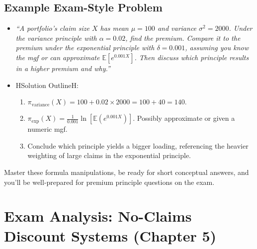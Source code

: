 \documentclass[13pt,a4paper]{article}
\begin{document}
\subsection{Example Exam-Style Problem}
\begin{itemize}
  \item \emph{“A portfolio’s claim size \(X\) has mean \(\mu=100\) and variance \(\sigma^2=2000\). Under the variance principle with \(\alpha=0.02\), find the premium. Compare it to the premium under the exponential principle with \(\delta=0.001\), assuming you know the mgf or can approximate \(\mathbb{E}[e^{0.001X}]\). Then discuss which principle results in a higher premium and why.”}
  \item HSolution OutlineH:
    \begin{enumerate}
      \item \(\pi_{\text{variance}}(X) = 100 + 0.02\times 2000=100+40=140.\)
      \item \(\pi_{\text{exp}}(X)=\frac{1}{0.001}\ln[\mathbb{E}(e^{0.001X})].\) Possibly approximate or given a numeric mgf. 
      \item Conclude which principle yields a bigger loading, referencing the heavier weighting of large claims in the exponential principle.
    \end{enumerate}
\end{itemize}

\noindent
Master these formula manipulations, be ready for short conceptual answers, and you’ll be well-prepared for premium principle questions on the exam.

\section{Exam Analysis: No-Claims Discount Systems (Chapter 5)}
\label{sec:ncd_exam_analysis}
\end{document}
